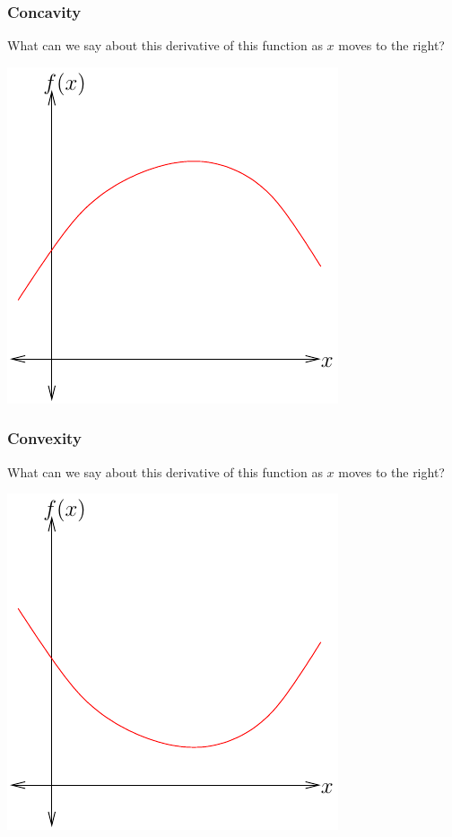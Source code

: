 \documentclass[xcolor=pdftex,dvipsnames]{beamer}
\begin{document}
\begin{frame}
\frametitle{Concavity}
What can we say about this derivative of this function as $x$ moves to
the right?
\begin{center}
\includegraphics{pics/concave}
\end{center}
\end{frame}



\begin{frame}
\frametitle{Convexity}
What can we say about this derivative of this function as $x$ moves to
the right?
\begin{center}
\includegraphics{pics/convex}
\end{center}
\end{frame}
\end{document}
